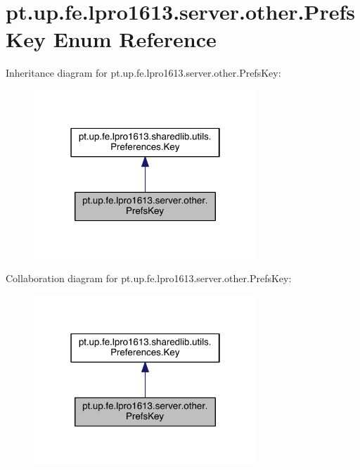 \hypertarget{enumpt_1_1up_1_1fe_1_1lpro1613_1_1server_1_1other_1_1_prefs_key}{}\section{pt.\+up.\+fe.\+lpro1613.\+server.\+other.\+Prefs\+Key Enum Reference}
\label{enumpt_1_1up_1_1fe_1_1lpro1613_1_1server_1_1other_1_1_prefs_key}


Inheritance diagram for pt.\+up.\+fe.\+lpro1613.\+server.\+other.\+Prefs\+Key\+:
\nopagebreak
\begin{figure}[H]
\begin{center}
\leavevmode
\includegraphics[width=238pt]{enumpt_1_1up_1_1fe_1_1lpro1613_1_1server_1_1other_1_1_prefs_key__inherit__graph}
\end{center}
\end{figure}


Collaboration diagram for pt.\+up.\+fe.\+lpro1613.\+server.\+other.\+Prefs\+Key\+:
\nopagebreak
\begin{figure}[H]
\begin{center}
\leavevmode
\includegraphics[width=238pt]{enumpt_1_1up_1_1fe_1_1lpro1613_1_1server_1_1other_1_1_prefs_key__coll__graph}
\end{center}
\end{figure}
